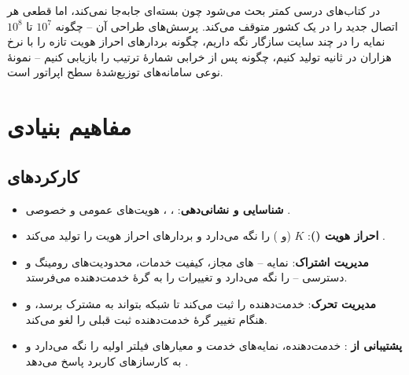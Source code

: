 \documentclass[11pt,a4paper]{article}
\begin{document}
 در کتاب‌های درسی کمتر بحث می‌شود چون بسته‌ای جابه‌جا نمی‌کند، اما قطعی  هر اتصال جدید را در
یک کشور متوقف می‌کند. پرسش‌های طراحی آن -- چگونه $10^7$ تا $10^8$ نمایه را در چند سایت سازگار نگه داریم، چگونه
بردارهای احراز هویت تازه را با نرخ هزاران در ثانیه تولید کنیم، چگونه پس از خرابی شمارهٔ ترتیب را بازیابی کنیم -- نمونهٔ
نوعی سامانه‌های توزیع‌شدهٔ سطح اپراتور است.

\section{مفاهیم بنیادی}

\subsection{کارکردهای }
\begin{itemize}
  \item \textbf{شناسایی و نشانی‌دهی}: ، ، هویت‌های عمومی و خصوصی  \cite{ts23003}.
  \item \textbf{احراز هویت ()}: $K$ (و ) را نگه می‌دارد و بردارهای احراز هویت را تولید می‌کند
        \cite{ts33102,ts33401}.
  \item \textbf{مدیریت اشتراک}: نمایه -- های مجاز، کیفیت خدمات، محدودیت‌های رومینگ و دسترسی -- را نگه
        می‌دارد و تغییرات را به گرهٔ خدمت‌دهنده می‌فرستد.
  \item \textbf{مدیریت تحرک}:  خدمت‌دهنده را ثبت می‌کند تا شبکه بتواند به مشترک برسد، و هنگام
        تغییر گرهٔ خدمت‌دهنده ثبت قبلی را لغو می‌کند.
  \item \textbf{پشتیبانی از }:  خدمت‌دهنده، نمایه‌های خدمت  و معیارهای فیلتر اولیه را نگه
        می‌دارد و به کارسازهای کاربرد پاسخ می‌دهد \cite{ts23228}.
\end{itemize}
\end{document}
